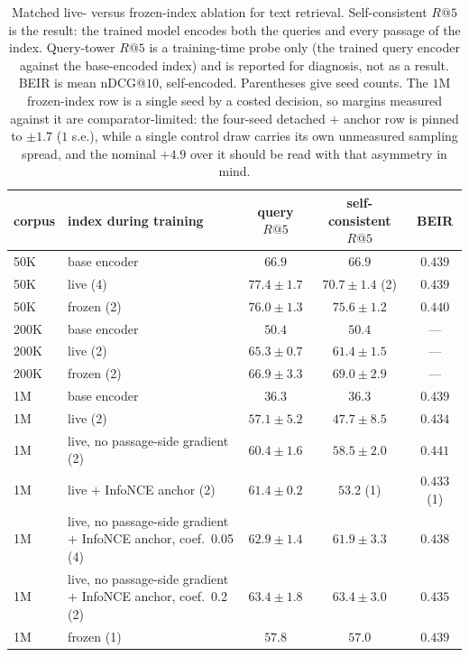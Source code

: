 \begin{table}[H]
\centering\small
\caption{Matched live- versus frozen-index ablation for text retrieval. Self-consistent $R@5$ is the result: the trained
model encodes both the queries and every passage of the index. Query-tower $R@5$ is a training-time probe only (the trained
query encoder against the base-encoded index) and is reported for diagnosis, not as a result. BEIR is mean nDCG@$10$,
self-encoded. Parentheses give seed counts. The $1$M frozen-index row is a single seed by a costed decision, so margins measured against it are comparator-limited: the four-seed detached $+$ anchor row is pinned to $\pm1.7$ ($1$ s.e.), while a single control draw carries its own unmeasured sampling spread, and the nominal $+4.9$ over it should be read with that asymmetry in mind.}
\label{tab:rag_refresh}
\begin{tabular}{llccc}
\toprule
corpus & index during training & query $R@5$ & self-consistent $R@5$ & BEIR \\
\midrule
50K & base encoder & $66.9$ & $66.9$ & $0.439$ \\
50K & live (4) & $77.4 \pm 1.7$ & $70.7 \pm 1.4$ (2) & $0.439$ \\
50K & frozen (2) & $76.0 \pm 1.3$ & $75.6 \pm 1.2$ & $0.440$ \\
\midrule
200K & base encoder & $50.4$ & $50.4$ & --- \\
200K & live (2) & $65.3 \pm 0.7$ & $61.4 \pm 1.5$ & --- \\
200K & frozen (2) & $66.9 \pm 3.3$ & $69.0 \pm 2.9$ & --- \\
\midrule
1M & base encoder & $36.3$ & $36.3$ & $0.439$ \\
1M & live (2) & $57.1 \pm 5.2$ & $47.7 \pm 8.5$ & $0.434$ \\
1M & live, no passage-side gradient (2) & $60.4 \pm 1.6$ & $58.5 \pm 2.0$ & $0.441$ \\
1M & live $+$ InfoNCE anchor (2) & $61.4 \pm 0.2$ & $53.2$ (1) & $0.433$ (1) \\
1M & live, no passage-side gradient $+$ InfoNCE anchor, coef.\ 0.05 (4) & $62.9 \pm 1.4$ & $\mathbf{61.9 \pm 3.3}$ & $0.438$ \\
1M & live, no passage-side gradient $+$ InfoNCE anchor, coef.\ 0.2 (2) & $63.4 \pm 1.8$ & $63.4 \pm 3.0$ & $0.435$ \\
1M & frozen (1) & $57.8$ & $57.0$ & $0.439$ \\
\bottomrule
\end{tabular}
\end{table}
